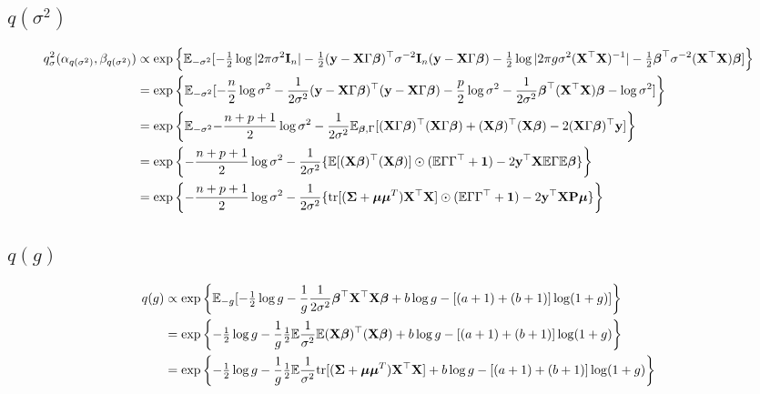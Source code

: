 \documentclass{amsart}[12pt]
\theoremstyle{definition}
\begin{document}
\subsection{$q(\sigma^2)$}
\begin{align*}
	q_\sigma^2(\alpha_{q(\sigma^2)}, \beta_{q(\sigma^2)}) & \propto \exp \left\{ \mathbb{E}_{-\sigma^2} [-\tfrac{1}{2} \log |2 \pi \sigma^2 {\bf I}_n| - \tfrac{1}{2} ({\bf y} - {\bf X} \Gamma {\boldsymbol\beta})^\top \sigma^{-2} {\bf I}_n ({\bf y} - {\bf X} \Gamma {\boldsymbol\beta}) - \tfrac{1}{2} \log |2 \pi g \sigma^2 ({\bf X}^\top {\bf X})^{-1}| - \tfrac{1}{2} {\boldsymbol \beta}^\top \sigma^{-2} ({\bf X}^\top {\bf X}) {\boldsymbol \beta}]  \right\} \\
	                                                      & = \exp \left\{ \mathbb{E}_{-\sigma^2} [- \frac{n}{2} \log \sigma^2 - \frac{1}{2 \sigma^2}({\bf y} - {\bf X} \Gamma {\boldsymbol\beta})^\top({\bf y} - {\bf X} \Gamma {\boldsymbol\beta}) - \frac{p}{2} \log \sigma^2 - \frac{1}{2 \sigma^2} {\boldsymbol \beta}^\top ({\bf X}^\top {\bf X}) {\boldsymbol \beta} - \log \sigma^2]  \right\}                        \\
	                                                      & = \exp \left\{ \mathbb{E}_{-\sigma^2} {-\frac{n + p + 1}{2} \log \sigma^2 - \frac{1}{2\sigma^2} \mathbb{E}_{{\boldsymbol \beta}, \Gamma} [({\bf X} \Gamma {\boldsymbol\beta})^\top ({\bf X} \Gamma {\boldsymbol\beta}) + ({\bf X} {\boldsymbol \beta})^\top ({\bf X} {\boldsymbol \beta}) - 2 ({\bf X} \Gamma {\boldsymbol\beta})^\top {\bf y}]}  \right\}                                         \\
	                                                      & = \exp \left\{ -\frac{n + p + 1}{2} \log \sigma^2 - \frac{1}{2 \sigma^2} \{\mathbb{E} [({\bf X} {\boldsymbol \beta})^\top ({\bf X} {\boldsymbol \beta})] \odot (\mathbb{E} \Gamma \Gamma^\top + {\bf 1}) - 2{\bf y}^\top {\bf X} \mathbb{E} \Gamma \mathbb{E} {\boldsymbol \beta}\} \right\}                                                                             \\
	                                                      & = \exp \left\{ -\frac{n + p + 1}{2} \log \sigma^2 - \frac{1}{2 \sigma^2} \{\text{tr}[({\boldsymbol \Sigma} + {\boldsymbol \mu} {\boldsymbol \mu}^T) {\bf X}^\top {\bf X}] \odot (\mathbb{E} \Gamma \Gamma^\top + {\bf 1}) - 2{\bf y}^\top {\bf X} {\bf P} {\boldsymbol\mu}\} \right\}                                                                                  \\
\end{align*}

\subsection{$q(g)$}
\begin{align*}
	q(g) & \propto \exp \left\{ \mathbb{E}_{-g} [-\tfrac{1}{2} \log g - \frac{1}{g} \frac{1}{2 \sigma^2} {\boldsymbol \beta}^\top {\bf X}^\top {\bf X} {\boldsymbol\beta} + b \log g - [(a + 1) + (b + 1)] \log(1 + g)] \right\}  \\
	     & = \exp \left\{ -\tfrac{1}{2} \log g - \frac{1}{g} \tfrac{1}{2} \mathbb{E} \frac{1}{\sigma^2} \mathbb{E} ({\bf X} {\boldsymbol \beta})^\top ({\bf X} {\boldsymbol \beta}) + b \log g - [(a + 1) + (b + 1)] \log(1 + g) \right\}         \\
	     & = \exp \left\{ -\tfrac{1}{2} \log g - \frac{1}{g} \tfrac{1}{2} \mathbb{E} \frac{1}{\sigma^2} \text{tr}[({\boldsymbol \Sigma} + {\boldsymbol \mu} {\boldsymbol \mu}^T) {\bf X}^\top {\bf X}] + b \log g - [(a + 1) + (b + 1)] \log(1 + g) \right\} \\
\end{align*}
\end{document}
